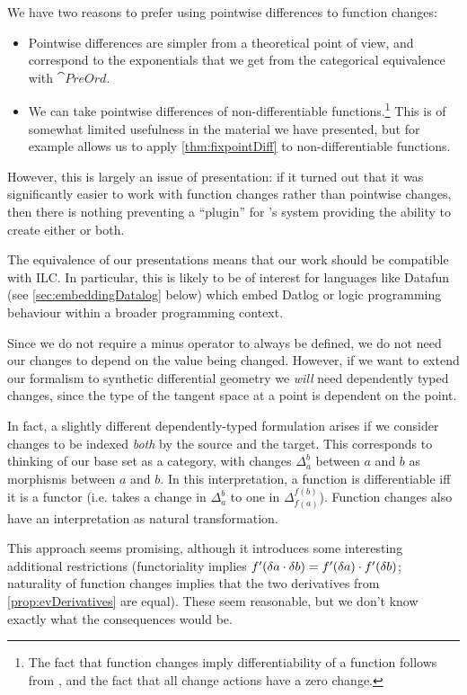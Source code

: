 We have two reasons to prefer using pointwise differences to function changes:
\begin{itemize}
  \item Pointwise differences are simpler from a theoretical point of view, and
    correspond to the exponentials that we get from the categorical equivalence with $\cat{PreOrd}$. 
  \item We can take pointwise differences of non-differentiable
    functions.\footnote{The fact that function changes imply differentiability
      of a function follows from \textcite[][Theorem 2.10]{cai2014changes}, and
      the fact that all change actions have a zero change.} This
    is of somewhat limited usefulness in the material we have presented, but for
    example allows us to apply \cref{thm:fixpointDiff} to non-differentiable functions.
\end{itemize}

However, this is largely an issue of presentation: if it turned out that it was
significantly easier to work with function changes rather than pointwise
changes, then there is nothing preventing a ``plugin'' for \citeauthor{cai2014changes}'s system providing the
ability to create either or both.

The equivalence of our presentations means that our work should be compatible
with ILC. In particular, this is likely to be of interest for languages like
Datafun (see \cref{sec:embeddingDatalog} below) which embed Datlog or logic programming behaviour within a broader
programming context.

Since we do not require a minus operator to always be defined, we do not need
our changes to depend on the value being changed. However,
if we want to extend our formalism to synthetic differential geometry we \emph{will} need
dependently typed changes, since the type of the tangent space at a point is
dependent on the point.

In fact, a slightly different dependently-typed formulation arises if we consider changes
to be indexed \emph{both} by the source and the target. This corresponds to 
thinking of our base set as a category, with changes $\Delta_a^b$ between $a$
and $b$ as morphisms between $a$ and $b$. In this interpretation, a function is
differentiable iff it is a functor (i.e. takes a change in $\Delta_a^b$ to one in
$\Delta_{f(a)}^{f(b)}$). Function changes also have an interpretation as natural
transformation.

This approach seems promising, although it introduces some
interesting additional restrictions (functoriality implies $f'(\delta a \cdot \delta b) =
f'(\delta a) \cdot f'(\delta b)$; naturality of function
changes implies that
the two derivatives from \cref{prop:evDerivatives} are equal). These seem
reasonable, but we don't know exactly what the consequences would be.

